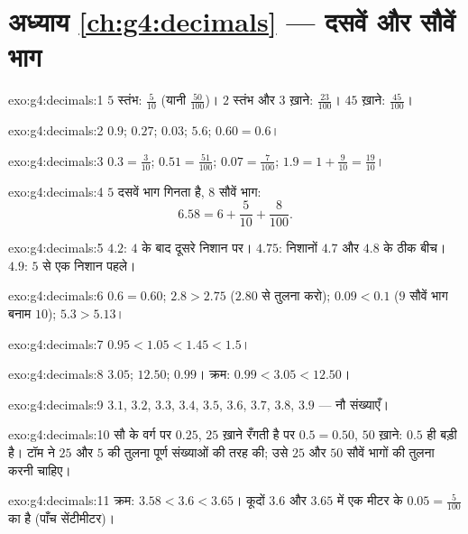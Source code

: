 \section*{अध्याय \ref{ch:g4:decimals} --- दसवें और सौवें भाग}

\begin{solution}{exo:g4:decimals:1}
$5$ स्तंभ: $\frac{5}{10}$ (यानी $\frac{50}{100}$)। $2$ स्तंभ
और $3$ ख़ाने: $\frac{23}{100}$। $45$ ख़ाने: $\frac{45}{100}$।
\end{solution}

\begin{solution}{exo:g4:decimals:2}
$0.9$; \quad $0.27$; \quad $0.03$; \quad $5.6$; \quad
$0.60 = 0.6$।
\end{solution}

\begin{solution}{exo:g4:decimals:3}
$0.3 = \frac{3}{10}$; \quad $0.51 = \frac{51}{100}$; \quad
$0.07 = \frac{7}{100}$; \quad $1.9 = 1 + \frac{9}{10} =
\frac{19}{10}$।
\end{solution}

\begin{solution}{exo:g4:decimals:4}
$5$ दसवें भाग गिनता है, $8$ सौवें भाग:
\[
6.58 = 6 + \frac{5}{10} + \frac{8}{100}.
\]
\end{solution}

\begin{solution}{exo:g4:decimals:5}
$4.2$: $4$ के बाद दूसरे निशान पर। $4.75$: निशानों
$4.7$ और $4.8$ के ठीक बीच। $4.9$: $5$ से एक निशान पहले।
\end{solution}

\begin{solution}{exo:g4:decimals:6}
$0.6 = 0.60$; \quad $2.8 > 2.75$ ($2.80$ से तुलना करो); \quad
$0.09 < 0.1$ ($9$ सौवें भाग बनाम $10$); \quad
$5.3 > 5.13$।
\end{solution}

\begin{solution}{exo:g4:decimals:7}
$0.95 < 1.05 < 1.45 < 1.5$।
\end{solution}

\begin{solution}{exo:g4:decimals:8}
$3.05$; \quad $12.50$; \quad $0.99$। क्रम:
$0.99 < 3.05 < 12.50$।
\end{solution}

\begin{solution}{exo:g4:decimals:9}
$3.1$, $3.2$, $3.3$, $3.4$, $3.5$, $3.6$, $3.7$, $3.8$, $3.9$ ---
नौ संख्याएँ।
\end{solution}

\begin{solution}{exo:g4:decimals:10}
सौ के वर्ग पर $0.25$, $25$ ख़ाने रँगती है पर $0.5 = 0.50$,
$50$ ख़ाने: $0.5$ ही बड़ी है। टॉम ने $25$ और $5$ की तुलना पूर्ण
संख्याओं की तरह की; उसे $25$ और $50$ सौवें भागों की तुलना करनी चाहिए।
\end{solution}

\begin{solution}{exo:g4:decimals:11}
क्रम: $3.58 < 3.6 < 3.65$। कूदों $3.6$ और $3.65$ में एक मीटर के
$0.05 = \frac{5}{100}$ का  है (पाँच सेंटीमीटर)।

\end{solution}
